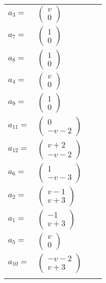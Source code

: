 \documentclass[1p]{elsarticle_modified}
\theoremstyle{definition}
\begin{document}
\begin{tabular}{m{7pt} m{180pt} m{7pt} m{180pt} }
\flushright $a_{3}=$&$\begin{pmatrix}v\\0\end{pmatrix}$ \\
\flushright $a_{7}=$&$\begin{pmatrix}1\\0\end{pmatrix}$ \\
\flushright $a_{8}=$&$\begin{pmatrix}1\\0\end{pmatrix}$ \\
\flushright $a_{4}=$&$\begin{pmatrix}v\\0\end{pmatrix}$ \\
\flushright $a_{9}=$&$\begin{pmatrix}1\\0\end{pmatrix}$ \\
\flushright $a_{11}=$&$\begin{pmatrix}0\\- v-2\end{pmatrix}$ \\
\flushright $a_{12}=$&$\begin{pmatrix}v+2\\- v-2\end{pmatrix}$ \\
\flushright $a_{6}=$&$\begin{pmatrix}1\\- v-3\end{pmatrix}$ \\
\flushright $a_{2}=$&$\begin{pmatrix}v-1\\v+3\end{pmatrix}$ \\
\flushright $a_{1}=$&$\begin{pmatrix}-1\\v+3\end{pmatrix}$ \\
\flushright $a_{5}=$&$\begin{pmatrix}v\\0\end{pmatrix}$ \\
\flushright $a_{10}=$&$\begin{pmatrix}- v-2\\v+3\end{pmatrix}$\\&\end{tabular}
\end{document}
